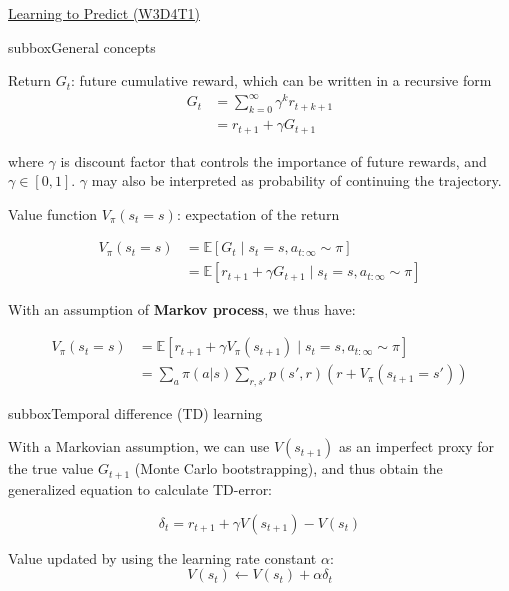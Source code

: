 \begin{textbox}{\href{https://compneuro.neuromatch.io/tutorials/W3D4_ReinforcementLearning/student/W3D4_Tutorial1.html}{Learning to Predict (W3D4T1)} }
\begin{subbox}{subbox}{General concepts}
\scriptsize


Return $G_{t}$: future cumulative reward, which can be written in a recursive form
\begin{align}
G_{t} &= \sum \limits_{k = 0}^{\infty} \gamma^{k} r_{t+k+1} \\
&= r_{t+1} + \gamma G_{t+1}
\end{align}

where $\gamma$ is discount factor that controls the importance of future rewards, and $\gamma \in [0, 1]$. $\gamma$ may also be interpreted as probability of continuing the trajectory.

Value function $V_{\pi}(s_t=s)$: expectation of the return

\begin{align}
V_{\pi}(s_t=s) &= \mathbb{E} [ G_{t}\; | \; s_t=s, a_{t:\infty}\sim\pi] \\
& = \mathbb{E} [ r_{t+1} + \gamma G_{t+1}\; | \; s_t=s, a_{t:\infty}\sim\pi]
\end{align}

With an assumption of \textbf{Markov process}, we thus have:

\begin{align}
V_{\pi}(s_t=s) &= \mathbb{E} [ r_{t+1} + \gamma V_{\pi}(s_{t+1})\; | \; s_t=s, a_{t:\infty}\sim\pi] \\
&= \sum_a \pi(a|s) \sum_{r, s'}p(s', r)(r + V_{\pi}(s_{t+1}=s'))
\end{align}
\end{subbox}
\begin{subbox}{subbox}{Temporal difference (TD) learning}
\scriptsize

With a Markovian assumption, we can use $V(s_{t+1})$ as an imperfect proxy for the true value $G_{t+1}$ (Monte Carlo bootstrapping), and thus obtain the generalized equation to calculate TD-error:

\begin{equation}
\delta_{t} = r_{t+1} + \gamma V(s_{t+1}) - V(s_{t})
\end{equation}

Value updated by using the learning rate constant $\alpha$:
\begin{equation}
V(s_{t}) \leftarrow V(s_{t}) + \alpha \delta_{t}
\end{equation}


\end{subbox}
\end{textbox}
